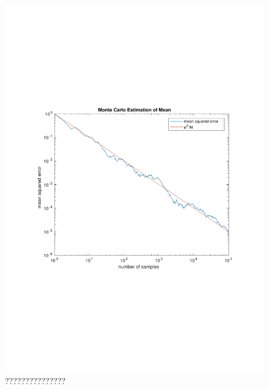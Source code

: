 \documentclass[12pt]{article}
\begin{document}
\begin{figure}[!htb]
\includegraphics[width=\paperwidth]{figures/mote-carlo-mean-estimator.pdf}
  \caption{???????????????}
  \label{fig:mote-mean}
\end{figure}
\end{document}
